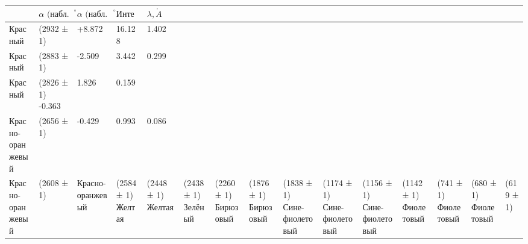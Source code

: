\documentclass[a4paper]{article}
\begin{document}
		\begin{center}
	
		\begin{tabular}{M{2,5 cm}M{3 cm}M{3 cm}M{3,5 cm}M{2,5 cm}} 
			
			\toprule
			
			{} & {$ \alpha \text{ (набл. 1), } ^\circ $} & {$ \alpha \text{ (набл. 2), } ^\circ $} & {$ \text{Интенсивность} $} & {$ \lambda, \mathring{A} $} \\
			
			\midrule
			
			Красный & (2932 ± 1) & +8.872 & 16.128 & 1.402 \\
			Красный & (2883 ± 1) & -2.509 & 3.442  & 0.299 \\
			Красный & (2826 ± 1) -0.363 & 1.826  & 0.159 \\
			Красно-оранжевый & (2656 ± 1) & -0.429 & 0.993  & 0.086 \\
			Красно-оранжевый & (2608 ± 1) & 
			Красно-оранжевый & (2584 ± 1)
			Желтая & (2448 ± 1)
			Желтая & (2438 ± 1)
			Зелёный & (2260 ± 1)
			Бирюзовый & (1876 ± 1)
			Бирюзовый & (1838 ± 1)
			Сине-фиолетовый & (1174 ± 1)
			Сине-фиолетовый & (1156 ± 1)
			Сине-фиолетовый & (1142 ± 1)
			Фиолетовый & (741 ± 1)
			Фиолетовый & (680 ± 1)
			Фиолетовый & (619 ± 1)
			
	 		\bottomrule
	 		
		\end{tabular}
		
		\end{center}
	
	
	
\end{document}
